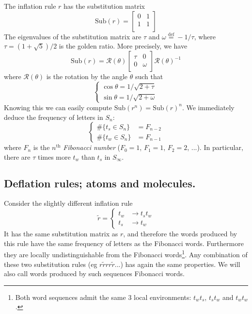 \documentclass[11pt]{article}
\newcommand{\define}{\ensuremath{ \overset{\text{def}}{=} }}
\numberwithin{equation}{section}
\begin{document}
The inflation rule $r$ has the substitution matrix
\begin{equation}
	\text{Sub}(r) = 
	\begin{bmatrix}
	0 & 1\\
	1 & 1\\
\end{bmatrix}
\end{equation}
The eigenvalues of the substitution matrix are $\tau$ and $\omega \define -1/\tau$, where $\tau = (1+\sqrt{5})/2$ is the golden ratio.
More precisely, we have 
\begin{equation}
	\text{Sub}(r) = \mathcal{R}(\theta) 
	\begin{bmatrix}
	\tau & 0\\
	0 & \omega \\
	\end{bmatrix}
	\mathcal{R}(\theta)^{-1}
\end{equation}
where $\mathcal{R}(\theta)$ is the rotation by the angle $\theta$ such that
\begin{equation}
\begin{cases}
\cos \theta = 1/\sqrt{2+\tau} \\
\sin \theta = 1/\sqrt{2+\omega}
\end{cases}
\end{equation}
Knowing this we can easily compute $\text{Sub}(r^n) = \text{Sub}(r)^n$. We immediately deduce the frequency of letters in $S_n$:
\begin{equation}
	\begin{cases}
	\#\{ t_s \in S_n \}  & = F_{n-2} \\
	\#\{ t_w \in S_n \} & = F_{n-1}
	\end{cases}
\end{equation}
where $F_n$ is the $n^\text{th}$ \emph{Fibonacci number} ($F_0 = 1$, $F_1 = 1$, $F_2 = 2$, ...).
In particular, there are $\tau$ times more $t_w$ than $t_s$ in $S_\infty$.

\subsection{Deflation rules; atoms and molecules.}

Consider the slightly different inflation rule
\begin{equation}
	\tilde{r} = \begin{cases}
        t_{w} & \rightarrow t_s t_w \\
        t_s & \rightarrow t_w
      \end{cases}
\end{equation} 
It has the same substitution matrix as $r$, and therefore the words produced by this rule have the same frequency of letters as the Fibonacci words. Furthermore they are locally undistinguishable from the Fibonacci words\footnote{Both word sequences admit the same 3 local environments: $t_w t_s$, $t_s t_w$ and $t_w t_w$.}. 
Any combination of these two substitution rules (eg $r \tilde{r} r r \tilde{r}...$) has again the same properties. We will also call words produced by such sequences Fibonacci words. 
\end{document}
